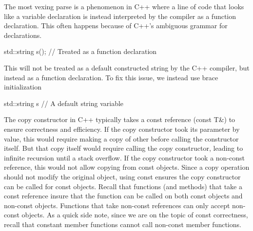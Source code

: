 \documentclass{report}
\begin{document}
    \pagebreak 
    \bigbreak \noindent 
    The most vexing parse is a phenomenon in C++ where a line of code that looks like a variable declaration is instead interpreted by the compiler as a function declaration. This often happens because of C++'s ambiguous grammar for declarations.
    \bigbreak \noindent 
    \begin{cppcode}
    std::string s(); // Treated as a function declaration
    \end{cppcode}
    \bigbreak \noindent 
    This will not be treated as a default constructed string by the C++ compiler, but instead as a function declaration. To fix this issue, we instead use brace initialization
    \bigbreak \noindent 
    \begin{cppcode}
        std::string s{} // A default string variable
    \end{cppcode}

    \pagebreak 
    \bigbreak \noindent 
    The copy constructor in C++ typically takes a const reference (const T\&) to ensure correctness and efficiency. If the copy constructor took its parameter by value, this would require making a copy of other before calling the constructor itself. But that copy itself would require calling the copy constructor, leading to infinite recursion until a stack overflow.
    \bigbreak \noindent 
    If the copy constructor took a non-const reference, this would not allow copying from const objects.
    \bigbreak \noindent 
    Since a copy operation should not modify the original object, using const ensures the copy constructor can be called for const objects.
    \bigbreak \noindent 
    Recall that functions (and methods) that take a const reference insure that the function can be called on both const objects and non-const objects. Functions that take non-const references can only accept non-const objects.
    \bigbreak \noindent 
    As a quick side note, since we are on the topic of const correctness, recall that constant member functions cannot call non-const member functions.
\end{document}
